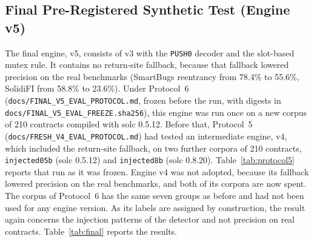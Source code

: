 \documentclass[pdflatex,sn-mathphys]{sn-jnl}
\theoremstyle{thmstyletwo}
\theoremstyle{thmstyletwo}
\begin{document}
\subsection{Final Pre-Registered Synthetic Test (Engine v5)}\label{sec:results:final}
The final engine, v5, consists of v3 with the \texttt{PUSH0} decoder and the slot-based mutex rule. It contains no return-site fallback, because that fallback lowered precision on the real benchmarks (SmartBugs reentrancy from 78.4\% to 55.6\%, SolidiFI from 58.8\% to 23.6\%). Under Protocol~6 (\texttt{docs/FINAL\_V5\_EVAL\_PROTOCOL.md}, frozen before the run, with digests in \texttt{docs/FINAL\_V5\_EVAL\_FREEZE.sha256}), this engine was run once on a new corpus of 210 contracts compiled with solc 0.5.12. Before that, Protocol~5 (\texttt{docs/FRESH\_V4\_EVAL\_PROTOCOL.md}) had tested an intermediate engine, v4, which included the return-site fallback, on two further corpora of 210 contracts, \texttt{injected05b} (solc 0.5.12) and \texttt{injected8b} (solc 0.8.20). Table~\ref{tab:protocol5} reports that run as it was frozen. Engine v4 was not adopted, because its fallback lowered precision on the real benchmarks, and both of its corpora are now spent. The corpus of Protocol~6 has the same seven groups as before and had not been used for any engine version. As its labels are assigned by construction, the result again concerns the injection patterns of the detector and not precision on real contracts. Table~\ref{tab:final} reports the results.

\begin{table}[t]
\centering
\small
\caption{Final pre-registered synthetic test (Protocol~6; 210 Solidity 0.5.12 contracts). Recall, precision and FPR with exact 95\% Clopper--Pearson intervals. Mythril had 12 timeouts and 1 error, which count as unflagged.}
\label{tab:final}
\end{table}
\end{document}
